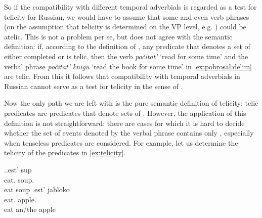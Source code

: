 So if the compatibility with different temporal adverbials is regarded as a test for telicity for Russian, we would have to assume that some  and even verb phrases (on the assumption that telicity is determined on the VP level, e.g. \citealt{Borer:05}) could be atelic. This is not a problem per se, but does not agree with the semantic definition: if, according to the definition of \citet[3]{Rothstein:08a}, any predicate that denotes a set of either completed or  is telic, then the verb \textit{po\v{c}itat'} `read for some time' and the verbal phrase \textit{po\v{c}itat' knigu} `read the book for some time' in \ref{ex:pobrosal:delim} are telic. From this it follows that compatibility with temporal adverbials in Russian cannot serve as a test for telicity in the sense of \citet{Rothstein:08a}.




Now the only path we are left with is the pure semantic definition of telicity: telic predicates are predicates that denote sets of . However, the application of this definition is not straightforward: there are cases for which it is hard to decide whether the set of events denoted by the verbal phrase contains only , especially when tenseless predicates are considered. For example, let us determine the telicity of the predicates in \ref{ex:telicity}.

\ex.\label{ex:telicity}\ag.\label{ex:telicity:soup}est' sup\\
eat. soup.\\
eat soup
\bg.\label{ex:telicity:apple}est' jabloko\\
eat. apple.\\
eat an/the apple

